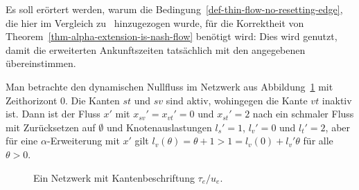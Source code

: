 \begin{remark}\label{remark-thin-flow-part-2}
	Es soll erörtert werden, warum die Bedingung~\ref{def-thin-flow-no-resetting-edge}, die hier im Vergleich zu~\cite[Definition~6]{Koch2011} hinzugezogen wurde, für die Korrektheit von Theorem~\ref{thm-alpha-extension-is-nash-flow} benötigt wird:
	Dies wird genutzt, damit die erweiterten Ankunftszeiten tatsächlich mit den angegebenen übereinstimmen.
	
	Man betrachte den dynamischen Nullfluss im Netzwerk aus Abbildung~\ref{figure-labels} mit Zeithorizont $0$.
	Die Kanten $st$ und $sv$ sind aktiv, wohingegen die Kante $vt$ inaktiv ist.
	Dann ist der Fluss $x'$ mit $x_{sv}'=x_{vt}' = 0$ und $x_{st}'=2$ nach \cite[Definition 6]{Koch2011} ein schmaler Fluss mit Zurücksetzen auf $\emptyset$ und Knotenauslastungen $l_s' = 1$, $l_v' = 0$ und $l_t' = 2$, aber für eine $\alpha$-Erweiterung mit $x'$ gilt $l_v(\theta) = \theta + 1 > 1 = l_v(0) + l_v' \theta$ für alle $\theta > 0$.

	\begin{figure}
		\centering
		\caption{Ein Netzwerk mit Kantenbeschriftung $\tau_e / u_e$.}
		\label{figure-labels}
	\end{figure}
\end{remark}

